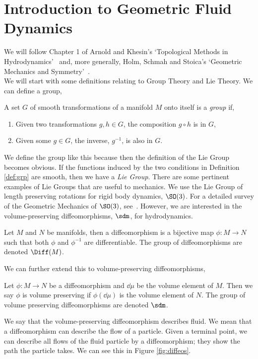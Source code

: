 
\section{Introduction to Geometric Fluid Dynamics}
We will follow Chapter 1 of Arnold and Khesin's `Topological Methods in Hydrodynamics'~\cite{tmih} and, more generally, Holm, Schmah and Stoica's `Geometric Mechanics and Symmetry'~\cite{holm}.\\

\noindent
We will start with some definitions relating to Group Theory and Lie Theory. We can define a group,
\begin{ndefi}
  \label{def:grp}
  A set $G$ of smooth transformations of a manifold $M$ onto itself is a \textit{group} if,
  \begin{enumerate}
    \item Given two transformations $g, h \in G$, the composition $g \circ h$ is in $G$,
    \item Given some $g \in G$, the inverse, $g^{-1}$, is also in $G$.
  \end{enumerate}
\end{ndefi}

\noindent
We define the group like this because then the definition of the Lie Group becomes obvious. If the functions induced by the two conditions in Definition \ref{def:grp} are smooth, then we have a \textit{Lie Group}. There are some pertinent examples of Lie Groups that are useful to mechanics. We use the Lie Group of length preserving rotations for rigid body dynamics, $\SO(3)$. For a detailed survey of the Geometric Mechanics of $\SO(3)$, see~\cite{arthur}. However, we are interested in the volume-preserving diffeomorphisms, $\sdm$, for hydrodynamics.
\begin{ndefi}[Diffeomorphism]
  Let $M$ and $N$ be manifolds, then a diffeomorphism is a bijective map $\phi: M \to N$ such that both $\phi$ and $\phi^{-1}$ are differentiable. The group of diffeomorphisms are denoted $\Diff(M)$.
\end{ndefi}
\noindent
We can further extend this to volume-preserving diffeomorphisms,
\begin{ndefi}
  Let $\phi : M \to N$ be a diffeomorphism and $\dd\mu$ be the volume element of $M$. Then we say $\phi$ is volume preserving if $\phi(\dd \mu)$ is the volume element of $N$. The group of volume preserving diffeomorphisms are denoted $\sdm$.
\end{ndefi}
\noindent
We say that the volume-preserving diffeomorphism describes fluid. We mean that a diffeomorphism can describe the flow of a particle. Given a terminal point, we can describe all flows of the fluid particle by a diffeomorphism; they show the path the particle takes. We can see this in Figure \ref{fig:diffeos}.\\

